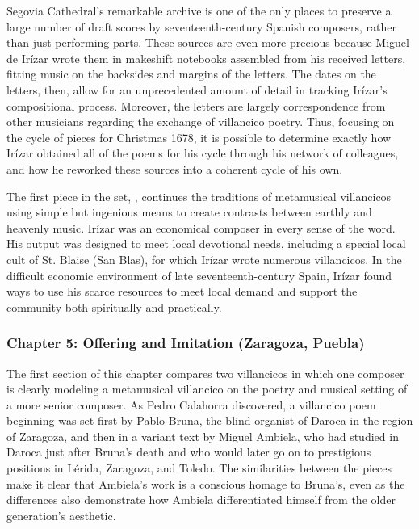 \documentclass{vcbook-proposal}
\begin{document}
Segovia Cathedral's remarkable archive is one of the only places to preserve a 
large number of draft scores by seventeenth-century Spanish composers, rather 
than just performing parts.
These sources are even more precious because Miguel de Irízar wrote them in
makeshift notebooks assembled from his received letters, fitting music on the
backsides and margins of the letters.
The dates on the letters, then, allow for an unprecedented amount of detail in
tracking Irízar's compositional process.
Moreover, the letters are largely correspondence from other musicians regarding 
the exchange of villancico poetry.
Thus, focusing on the cycle of pieces for Christmas 1678, it is possible to 
determine exactly how Irízar obtained all of the poems for his cycle through 
his network of colleagues, and how he reworked these sources into a coherent 
cycle of his own.

The first piece in the set, , continues the 
traditions of metamusical villancicos using simple but ingenious means to 
create contrasts between earthly and heavenly music.
Irízar was an economical composer in every sense of the word.
His output was designed to meet local devotional needs, including a special 
local cult of St. Blaise (San Blas), for which Irízar wrote numerous 
villancicos. 
In the difficult economic environment of late seventeenth-century Spain, Irízar 
found ways to use his scarce resources to meet local demand and support the 
community both spiritually and practically.

\subsubsection{Chapter 5: Offering and Imitation (Zaragoza, Puebla)}


The first section of this chapter compares two villancicos in which one composer
is clearly modeling a metamusical villancico on the poetry and musical setting
of a more senior composer.
As Pedro Calahorra discovered, a villancico poem beginning  was set first by Pablo Bruna, the blind organist of Daroca in 
the region of Zaragoza, and then in a variant text by Miguel Ambiela, who had 
studied in Daroca just after Bruna's death and who would later go on to 
prestigious positions in Lérida, Zaragoza, and Toledo.%
  \Autocite{Calahorra:Suban}
The similarities between the pieces make it clear that Ambiela's work is a 
conscious homage to Bruna's, even as the differences also demonstrate how 
Ambiela differentiated himself from the older generation's aesthetic. 
\end{document}
